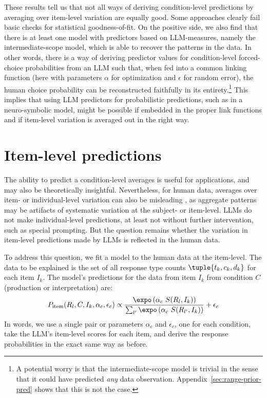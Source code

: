 \documentclass[fleqn]{article}
\begin{document}
These results tell us that not all ways of deriving condition-level predictions by averaging over item-level variation are equally good.
Some approaches clearly fail basic checks for statistical goodness-of-fit.
On the positive side, we also find that there is at least one model with predictors based on LLM-measures, namely the intermediate-scope model, which is able to recover the patterns in the data.
In other words, there is a way of deriving predictor values for condition-level forced-choice probabilities from an LLM such that, when fed into a common linking function (here with parameters $\alpha$ for optimization and $\epsilon$ for random error), the human choice probability can be reconstructed faithfully in its entirety.\footnote{
  A potential worry is that the intermediate-scope model is trivial in the sense that it could have predicted \emph{any} data observation.
  Appendix~\ref{sec:range-prior-pred} shows that this is not the case.
}
This implies that using LLM predictors for probabilistic predictions, such as in a neuro-symbolic model, might be possible if embedded in the proper link functions and if item-level variation is averaged out in the right way.


\section{Item-level predictions}
\label{sec:item-level-pred}

The ability to predict a condition-level averages is useful for applications, and may also be theoretically insightful.
Nevertheless, for human data, averages over item- or individual-level variation can also be misleading \citep[e.g.,][]{StanovichWest2000:Individual-diff,EstesMaddox2005:Risks-of-Drawin,HaafRouder2019:Some-do-and-som}, as aggregate patterns may be artifacts of systematic variation at the subject- or item-level.
LLMs do not make individual-level predictions, at least not without further intervention, such as special prompting.
But the question remains whether the variation in item-level predictions made by LLMs is reflected in the human data.

To address this question, we fit a model to the human data at the item-level.
The data to be explained is the set of all response type counts $\tuple{t_{k}, c_{k}, d_{k}}$ for each item $I_{k}$.
The model's predictions for the data from item $I_{k}$ from condition $C$ (production or interpretation) are:
%
\begin{align*}
  P_{\text{item}}(R_{l}, C, I_{k}, \alpha_{c}, \epsilon_{c}) \propto \frac{\expo \left( \alpha_{c} \ S(R_{l}, I_{k}) \right )}{ \sum_{l'} \expo \left( \alpha_{c} \ S(R_{l'}, I_{k}) \right )} + \epsilon_{c}
\end{align*}
%
In words, we use a single pair or parameters $\alpha_{c}$ and $\epsilon_{c}$, one for each condition, take the LLM's item-level scores for each item, and derive the response probabilities in the exact same way as before.
\end{document}
